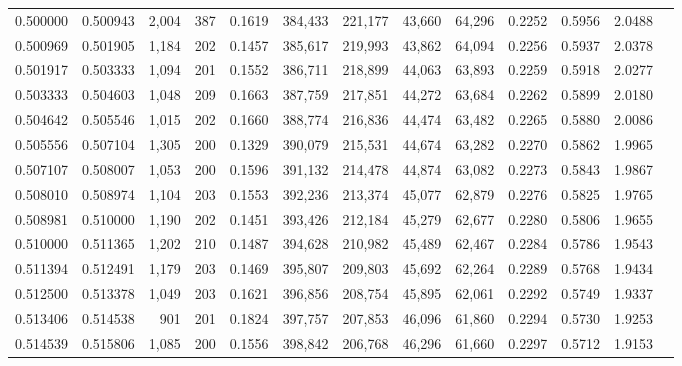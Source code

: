 \begin{tabular}{rrrrrrrrrrrrr}
0.500000 & 0.500943 &  2,004 &   387 &                                     0.1619 & 384,433 & 221,177 &  43,660 &  64,296 & 0.2252 & 0.5956 & 2.0488 \\
0.500969 & 0.501905 &  1,184 &   202 &                                     0.1457 & 385,617 & 219,993 &  43,862 &  64,094 & 0.2256 & 0.5937 & 2.0378 \\
0.501917 & 0.503333 &  1,094 &   201 &                                     0.1552 & 386,711 & 218,899 &  44,063 &  63,893 & 0.2259 & 0.5918 & 2.0277 \\
0.503333 & 0.504603 &  1,048 &   209 &                                     0.1663 & 387,759 & 217,851 &  44,272 &  63,684 & 0.2262 & 0.5899 & 2.0180 \\
0.504642 & 0.505546 &  1,015 &   202 &                                     0.1660 & 388,774 & 216,836 &  44,474 &  63,482 & 0.2265 & 0.5880 & 2.0086 \\
0.505556 & 0.507104 &  1,305 &   200 &                                     0.1329 & 390,079 & 215,531 &  44,674 &  63,282 & 0.2270 & 0.5862 & 1.9965 \\
0.507107 & 0.508007 &  1,053 &   200 &                                     0.1596 & 391,132 & 214,478 &  44,874 &  63,082 & 0.2273 & 0.5843 & 1.9867 \\
0.508010 & 0.508974 &  1,104 &   203 &                                     0.1553 & 392,236 & 213,374 &  45,077 &  62,879 & 0.2276 & 0.5825 & 1.9765 \\
0.508981 & 0.510000 &  1,190 &   202 &                                     0.1451 & 393,426 & 212,184 &  45,279 &  62,677 & 0.2280 & 0.5806 & 1.9655 \\
0.510000 & 0.511365 &  1,202 &   210 &                                     0.1487 & 394,628 & 210,982 &  45,489 &  62,467 & 0.2284 & 0.5786 & 1.9543 \\
0.511394 & 0.512491 &  1,179 &   203 &                                     0.1469 & 395,807 & 209,803 &  45,692 &  62,264 & 0.2289 & 0.5768 & 1.9434 \\
0.512500 & 0.513378 &  1,049 &   203 &                                     0.1621 & 396,856 & 208,754 &  45,895 &  62,061 & 0.2292 & 0.5749 & 1.9337 \\
0.513406 & 0.514538 &    901 &   201 &                                     0.1824 & 397,757 & 207,853 &  46,096 &  61,860 & 0.2294 & 0.5730 & 1.9253 \\
0.514539 & 0.515806 &  1,085 &   200 &                                     0.1556 & 398,842 & 206,768 &  46,296 &  61,660 & 0.2297 & 0.5712 & 1.9153 \\

\end{tabular}
